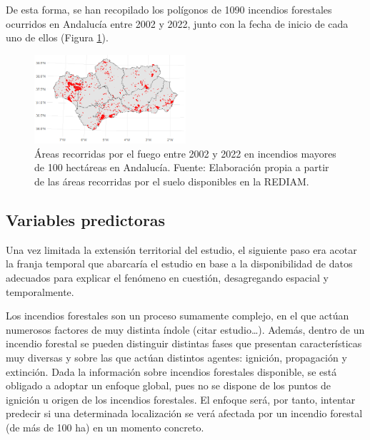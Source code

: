 \documentclass[12pt,a4paper,]{book}
\numberwithin{dummy}{section}
\theoremstyle{ocrenumbox}
\theoremstyle{blacknumex}
\theoremstyle{blacknumbox}
\theoremstyle{ocrenum}
\theoremstyle{ocrenum}
\begin{document}
De esta forma, se han recopilado los polígonos de 1090 incendios
forestales ocurridos en Andalucía entre 2002 y 2022, junto con la fecha
de inicio de cada uno de ellos (Figura \ref{fig:area_fuego}).

\begin{figure}[thb]
\centering
\includegraphics[width=0.5\textwidth]{graficos/areas_fuego.png}
\caption[Áreas recorridas por el fuego entre 2002 y 2022 en incendios mayores de 100 hectáreas en Andalucía]{Áreas recorridas por el fuego entre 2002 y 2022 en incendios mayores de 100 hectáreas en Andalucía. Fuente: Elaboración propia a partir de las áreas recorridas por el suelo disponibles en la REDIAM.}
\label{fig:area_fuego}
\end{figure}

\hypertarget{variables-predictoras}{%
\subsection{Variables predictoras}\label{variables-predictoras}}

Una vez limitada la extensión territorial del estudio, el siguiente paso
era acotar la franja temporal que abarcaría el estudio en base a la
disponibilidad de datos adecuados para explicar el fenómeno en cuestión,
desagregando espacial y temporalmente.

Los incendios forestales son un proceso sumamente complejo, en el que
actúan numerosos factores de muy distinta índole (citar estudio\ldots).
Además, dentro de un incendio forestal se pueden distinguir distintas
fases que presentan características muy diversas y sobre las que actúan
distintos agentes: ignición, propagación y extinción. Dada la
información sobre incendios forestales disponible, se está obligado a
adoptar un enfoque global, pues no se dispone de los puntos de ignición
u origen de los incendios forestales. El enfoque será, por tanto,
intentar predecir si una determinada localización se verá afectada por
un incendio forestal (de más de 100 ha) en un momento concreto.
\end{document}
